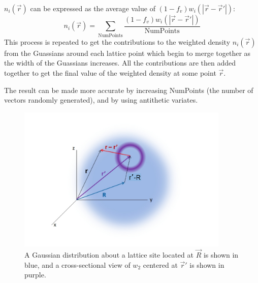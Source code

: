 \documentclass[double,12pt]{beavtex}
\begin{document}
$n_i(\vec{r})$ can be expressed as the average value of $(1-f_v)w_i(|\vec{r}-\vec{r}'|)$:
\begin{equation}{n_i(\vec{r})=\sum_{\text{NumPoints}}\frac{(1-f_v)w_i(|\vec{r}-\vec{r}'|)}{\text{NumPoints}}}\end{equation}
This process is repeated to get the contributions to the weighted density 
$n_i(\vec r)$ from the Guassians around each lattice point which begin to 
merge together as the width of the Guassians increases.
All the contributions are then added together 
to get the final value of the weighted density at some point $\vec r$.

The result can be made more accurate by increasing NumPoints (the 
number of vectors randomly generated), and by using antithetic variates.
%
 \begin{figure}[h!]
    \centering
    \includegraphics[height=7cm]{figs/weightandGauss1.pdf}
    \caption{A Gaussian distribution about a lattice site located at 
    $\vec R$ is shown in blue, and a cross-sectional 
    view of $w_2$ centered at $\vec{r}'$ is shown in purple.} 
  \label{fig:GaussandW2_actual}
  \end{figure} 
%
\end{document}
